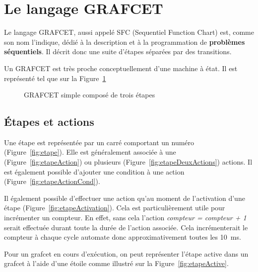 \section{Le langage GRAFCET}

Le langage GRAFCET, aussi appelé SFC (Sequentiel Function Chart) est, comme son nom l'indique, dédié à la description et à la programmation de \textbf{problèmes séquentiels}. Il décrit donc une suite d'étapes séparées par des transitions.

Un GRAFCET est très proche conceptuellement d'une machine à état. Il est représenté tel que sur la Figure~\ref{fig:simpleGrafcet}

\begin{figure}[ht]
  \centering
  
  \caption{GRAFCET simple composé de trois étapes}
  \label{fig:simpleGrafcet}
\end{figure}

\subsection{Étapes et actions}

Une étape est représentée par un carré comportant un numéro (Figure~\ref{fig:etape}). Elle est généralement associée à une  (Figure~\ref{fig:etapeAction}) ou plusieurs (Figure~\ref{fig:etapeDeuxActions}) actions.
Il est également possible d'ajouter une condition à une action (Figure~\ref{fig:etapeActionCond}).


Il également possible d'effectuer une action qu'au moment de l'activation d'une étape (Figure~\ref{fig:etapeActivation}). Cela est particulièrement utile pour incrémenter un compteur.
En effet, sans cela l'action \textit{compteur = compteur + 1} serait effectuée durant toute la durée de l'action associée. Cela incrémenterait le compteur à chaque cycle automate donc approximativement toutes les \SI{10}{ms}.

Pour un grafcet en cours d'exécution, on peut représenter l'étape active dans un grafcet à l'aide d'une étoile comme illustré sur la Figure~\ref{fig:etapeActive}.

